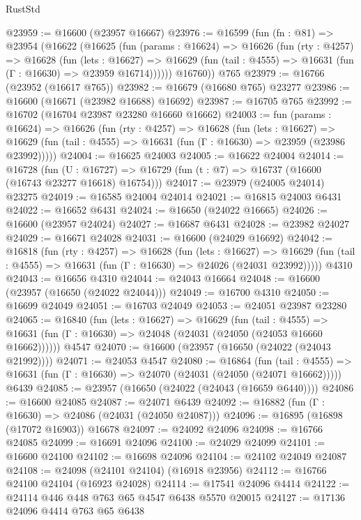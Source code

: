 \begin{lexlean}{RustStd}
\begin{coremodule}
{\begin{coremodule}
{{{{{{{{{{{{{{{{{{{{{{{{{{{{{{{{{{{{{{{{{{{{{{{{{{{{{{{@23959 := @16600 (@23957 @16667)
@23976 := @16599
    (fun (fn : @81) =>
    @23954
      (@16622
        (@16625
          (fun (params : @16624) =>
          @16626
            (fun (rty : @4257) =>
            @16628
              (fun (lets : @16627) =>
              @16629 (fun (tail : @4555) => @16631 (fun (Γ : @16630) => @23959 @16714))))))
        @16760))
    @765
@23979 := @16766 (@23952 (@16617 @765))
@23982 := @16679 (@16680 @765) @23277
@23986 := @16600 (@16671 (@23982 @16688) @16692)
@23987 := @16705 @765
@23992 := @16702 (@16704 @23987 @23280 @16660 @16662)
@24003 := fun (params : @16624) =>
  @16626
    (fun (rty : @4257) =>
    @16628
      (fun (lets : @16627) =>
      @16629 (fun (tail : @4555) => @16631 (fun (Γ : @16630) => @23959 (@23986 @23992)))))
@24004 := @16625 @24003
@24005 := @16622 @24004
@24014 := @16728
    (fun (U : @16727) => @16729 (fun (t : @7) => @16737 (@16600 (@16743 @23277 @16618) @16754)))
@24017 := @23979 (@24005 @24014) @23275
@24019 := @16585 @24004 @24014
@24021 := @16815 @24003 @6431
@24022 := @16652 @6431
@24024 := @16650 (@24022 @16665)
@24026 := @16600 (@23957 @24024)
@24027 := @16687 @6431
@24028 := @23982 @24027
@24029 := @16671 @24028
@24031 := @16600 (@24029 @16692)
@24042 := @16818
    (fun (rty : @4257) =>
    @16628
      (fun (lets : @16627) =>
      @16629 (fun (tail : @4555) => @16631 (fun (Γ : @16630) => @24026 (@24031 @23992)))))
    @4310
@24043 := @16656 @4310
@24044 := @24043 @16664
@24048 := @16600 (@23957 (@16650 (@24022 @24044)))
@24049 := @16700 @4310
@24050 := @16699 @24049
@24051 := @16703 @24049
@24053 := @24051 @23987 @23280
@24065 := @16840
    (fun (lets : @16627) =>
    @16629
      (fun (tail : @4555) =>
      @16631 (fun (Γ : @16630) => @24048 (@24031 (@24050 (@24053 @16660 @16662))))))
    @4547
@24070 := @16600 (@23957 (@16650 (@24022 (@24043 @21992))))
@24071 := @24053 @4547
@24080 := @16864
    (fun (tail : @4555) => @16631 (fun (Γ : @16630) => @24070 (@24031 (@24050 (@24071 @16662)))))
    @6439
@24085 := @23957 (@16650 (@24022 (@24043 (@16659 @6440))))
@24086 := @16600 @24085
@24087 := @24071 @6439
@24092 := @16882 (fun (Γ : @16630) => @24086 (@24031 (@24050 @24087)))
@24096 := @16895 (@16898 (@17072 @16903)) @16678
@24097 := @24092 @24096
@24098 := @16766 @24085
@24099 := @16691 @24096
@24100 := @24029 @24099
@24101 := @16600 @24100
@24102 := @16698 @24096
@24104 := @24102 @24049 @24087
@24108 := @24098 (@24101 @24104) (@16918 @23956)
@24112 := @16766 @24100 @24104 (@16923 @24028)
@24114 := @17541 @24096 @4414
@24122 := @24114 @446 @448 @763 @65 @4547 @6438 @5570 @20015
@24127 := @17136 @24096 @4414 @763 @65 @6438
}}}}}}}}}}}}}}}}}}}}}}}}}}}}}}}}}}}}}}}}}}}}}}}}}}}}}}}
\end{coremodule}}
\end{coremodule}
\end{lexlean}

